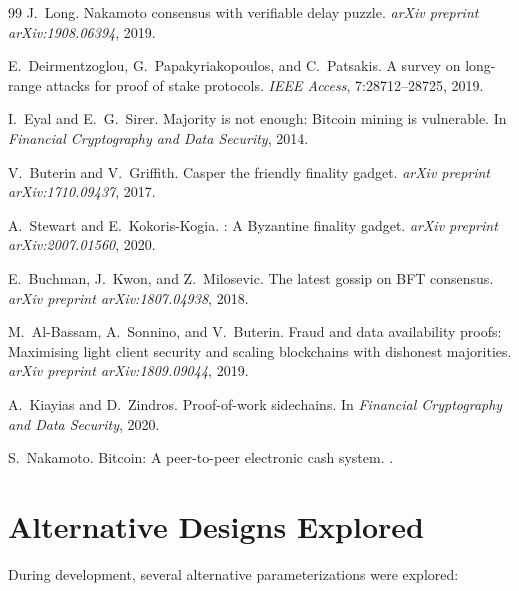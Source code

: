 \documentclass[11pt]{article}
\begin{document}
\begin{thebibliography}{99}
J.~Long.
\newblock Nakamoto consensus with verifiable delay puzzle.
\newblock \emph{arXiv preprint arXiv:1908.06394}, 2019.

E.~Deirmentzoglou, G.~Papakyriakopoulos, and C.~Patsakis.
\newblock A survey on long-range attacks for proof of stake protocols.
\newblock \emph{IEEE Access}, 7:28712--28725, 2019.

I.~Eyal and E.~G.~Sirer.
\newblock Majority is not enough: {Bitcoin} mining is vulnerable.
\newblock In \emph{Financial Cryptography and Data Security}, 2014.

V.~Buterin and V.~Griffith.
\newblock Casper the friendly finality gadget.
\newblock \emph{arXiv preprint arXiv:1710.09437}, 2017.

A.~Stewart and E.~Kokoris-Kogia.
: A {Byzantine} finality gadget.
\newblock \emph{arXiv preprint arXiv:2007.01560}, 2020.

E.~Buchman, J.~Kwon, and Z.~Milosevic.
\newblock The latest gossip on {BFT} consensus.
\newblock \emph{arXiv preprint arXiv:1807.04938}, 2018.

M.~Al-Bassam, A.~Sonnino, and V.~Buterin.
\newblock Fraud and data availability proofs: Maximising light client security and scaling blockchains with dishonest majorities.
\newblock \emph{arXiv preprint arXiv:1809.09044}, 2019.

A.~Kiayias and D.~Zindros.
\newblock Proof-of-work sidechains.
\newblock In \emph{Financial Cryptography and Data Security}, 2020.

S.~Nakamoto.
\newblock Bitcoin: A peer-to-peer electronic cash system.
.

\end{thebibliography}

\appendix

\section{Alternative Designs Explored}

During development, several alternative parameterizations were explored:
\end{document}
